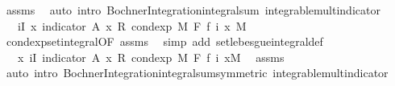 \begin{isabellebody}
\ assms\ \isamarkupfalse%
\ {\isacharparenleft}{\kern0pt}auto\ intro{\isacharbang}{\kern0pt}{\isacharcolon}{\kern0pt}\ Bochner{\isacharunderscore}{\kern0pt}Integration{\isachardot}{\kern0pt}integral{\isacharunderscore}{\kern0pt}sum\ integrable{\isacharunderscore}{\kern0pt}mult{\isacharunderscore}{\kern0pt}indicator{\isacharparenright}{\kern0pt}\isanewline
\ \ \isamarkupfalse%
\ \isamarkupfalse%
\ {\isachardoublequoteopen}{\isachardot}{\kern0pt}{\isachardot}{\kern0pt}{\isachardot}{\kern0pt}\ {\isacharequal}{\kern0pt}\ {\isacharparenleft}{\kern0pt}{\isasymSum}i{\isasymin}I{\isachardot}{\kern0pt}\ {\isacharparenleft}{\kern0pt}{\isasymintegral}x{\isachardot}{\kern0pt}\ indicator\ A\ x\ {\isacharasterisk}{\kern0pt}\isactrlsub R\ cond{\isacharunderscore}{\kern0pt}exp\ M\ F\ {\isacharparenleft}{\kern0pt}f\ i{\isacharparenright}{\kern0pt}\ x\ {\isasympartial}M{\isacharparenright}{\kern0pt}{\isacharparenright}{\kern0pt}{\isachardoublequoteclose}\ \isamarkupfalse%
\ cond{\isacharunderscore}{\kern0pt}exp{\isacharunderscore}{\kern0pt}set{\isacharunderscore}{\kern0pt}integral{\isacharbrackleft}{\kern0pt}OF\ assms{\isacharbrackright}{\kern0pt}\ \isamarkupfalse%
\ {\isacharparenleft}{\kern0pt}simp\ add{\isacharcolon}{\kern0pt}\ set{\isacharunderscore}{\kern0pt}lebesgue{\isacharunderscore}{\kern0pt}integral{\isacharunderscore}{\kern0pt}def{\isacharparenright}{\kern0pt}\isanewline
\ \ \isamarkupfalse%
\ \isamarkupfalse%
\ {\isachardoublequoteopen}{\isachardot}{\kern0pt}{\isachardot}{\kern0pt}{\isachardot}{\kern0pt}\ {\isacharequal}{\kern0pt}\ {\isacharparenleft}{\kern0pt}{\isasymintegral}x{\isachardot}{\kern0pt}\ {\isacharparenleft}{\kern0pt}{\isasymSum}i{\isasymin}I{\isachardot}{\kern0pt}\ indicator\ A\ x\ {\isacharasterisk}{\kern0pt}\isactrlsub R\ cond{\isacharunderscore}{\kern0pt}exp\ M\ F\ {\isacharparenleft}{\kern0pt}f\ i{\isacharparenright}{\kern0pt}\ x{\isacharparenright}{\kern0pt}{\isasympartial}M{\isacharparenright}{\kern0pt}{\isachardoublequoteclose}\ \isamarkupfalse%
\ assms\ \isamarkupfalse%
\ {\isacharparenleft}{\kern0pt}auto\ intro{\isacharbang}{\kern0pt}{\isacharcolon}{\kern0pt}\ Bochner{\isacharunderscore}{\kern0pt}Integration{\isachardot}{\kern0pt}integral{\isacharunderscore}{\kern0pt}sum{\isacharbrackleft}{\kern0pt}symmetric{\isacharbrackright}{\kern0pt}\ integrable{\isacharunderscore}{\kern0pt}mult{\isacharunderscore}{\kern0pt}indicator{\isacharparenright}{\kern0pt}\isanewline
\ \ \isamarkupfalse%

\end{isabellebody}
